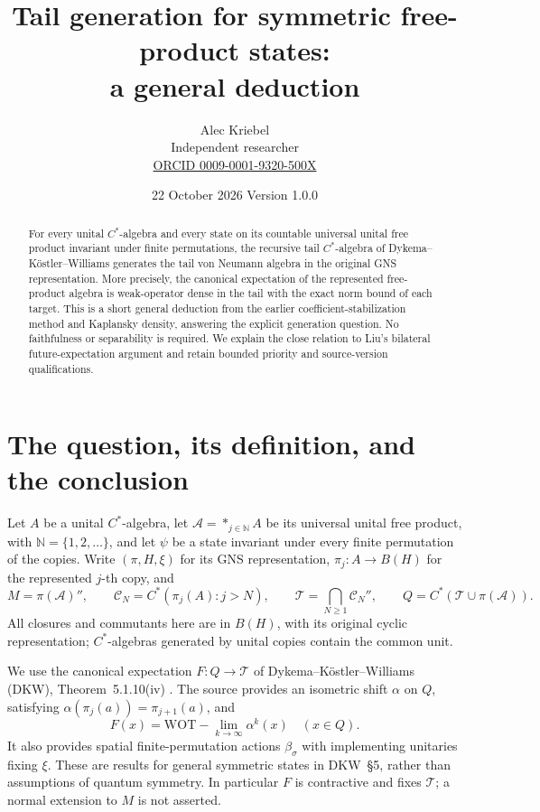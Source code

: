\documentclass[11pt]{article}
\title{Tail generation for symmetric free-product states:\\a general deduction}
\author{Alec Kriebel\\
\small Independent researcher\\
\small \href{https://orcid.org/0009-0001-9320-500X}{ORCID 0009-0001-9320-500X}}
\date{22 October 2026 \quad Version 1.0.0}
\newcommand{\A}{\mathcal A}
\newcommand{\T}{\mathcal T}
\newcommand{\C}{\mathcal C}
\newcommand{\WOT}{\mathrm{WOT}}
\begin{document}
\maketitle
\begin{abstract}
For every unital \(C^*\)-algebra and every state on its countable universal
unital free product invariant under finite permutations, the recursive
tail \(C^*\)-algebra of Dykema--K\"ostler--Williams generates the tail von
Neumann algebra in the original GNS representation. More precisely,
the canonical expectation of the represented free-product algebra is
weak-operator dense in the tail with the exact norm bound of each target.
This is a short general deduction from the earlier coefficient-stabilization
method and Kaplansky density, answering the explicit generation question.
No faithfulness or separability is required. We explain the close relation
to Liu's bilateral future-expectation argument and retain bounded
priority and source-version qualifications.
\end{abstract}

\section{The question, its definition, and the conclusion}
Let \(A\) be a unital \(C^*\)-algebra, let
\(\A=*_{j\in\mathbb N}A\) be its universal unital free product, with
\(\mathbb N=\{1,2,\ldots\}\), and let \(\psi\) be a state invariant under
every finite permutation of the copies. Write \((\pi,H,\xi)\) for its
GNS representation, \(\pi_j:A\to B(H)\) for the represented \(j\)-th
copy, and
\[
 M=\pi(\A)'',\qquad
 \C_N=C^*(\pi_j(A):j>N),\qquad
 \T=\bigcap_{N\geq1}\C_N'',\qquad
 Q=C^*(\T\cup\pi(\A)).
\]
All closures and commutants here are in \(B(H)\), with its original
cyclic representation; \(C^*\)-algebras generated by unital copies
contain the common unit.

We use the canonical expectation \(F:Q\to\T\) of
Dykema--K\"ostler--Williams (DKW), Theorem~5.1.10(iv) \cite{DKW}.
The source provides an isometric shift \(\alpha\) on \(Q\), satisfying
\(\alpha(\pi_j(a))=\pi_{j+1}(a)\), and
\begin{equation}\label{shiftlimit}
 F(x)=\WOT\!-\!\lim_{k\to\infty}\alpha^k(x)\quad(x\in Q).
\end{equation}
It also provides spatial finite-permutation actions \(\beta_\sigma\)
with implementing unitaries fixing \(\xi\).
These are results for general symmetric states in DKW~\S5, rather than
assumptions of quantum symmetry. In particular \(F\) is contractive
and fixes \(\T\); a normal extension to \(M\) is not asserted.
\end{document}
